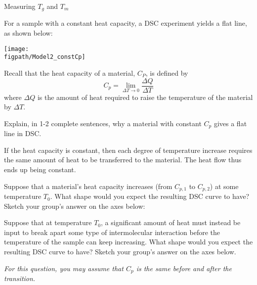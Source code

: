 \begin{activity}{Measuring $T_g$ and $T_m$}
\begin{model}
	For a sample with a constant heat capacity, a DSC experiment yields a flat line, as shown below:
	
		\centerline{\texttt{[image: \\figpath/Model2\_constCp]}}
	
\end{model}

\begin{ctqs}

	\question Recall that the heat capacity of a material, $C_P$, is defined by
		\begin{equation*}
			C_p = \lim_{\Delta T\to 0} \frac{\Delta Q}{\Delta T}
		\end{equation*}
		where $\Delta Q$ is the amount of heat required to raise the temperature of the material by $\Delta T$.
		
		Explain, in 1-2 complete sentences, why a material with constant $C_p$ gives a flat line in DSC.
		
			\begin{solution}[1in]
				If the heat capacity is constant, then each degree of temperature increase requires the same amount of heat to be transferred to the material.  The heat flow thus ends up being constant.
			\end{solution}
		
	\question Suppose that a material's heat capacity increases (from $C_{p,1}$ to $C_{p,2}$) at some temperature $T_0$.  What shape would you expect the resulting DSC curve to have?  Sketch your group's answer on the axes below: \label{\labelbase:ctq:CPincrease}
	
		\vspace{6pt}
		\begin{solution}[1.9in]\end{solution}
		
	\question Suppose that at temperature $T_0$, a significant amount of heat must instead be input to break apart some type of intermolecular interaction before the temperature of the sample can keep increasing.  What shape would you expect the resulting DSC curve to have?  Sketch your group's answer on the axes below.\label{\labelbase:ctq:delHtrans}
	
		\emph{For this question, you may assume that $C_p$ is the same before and after the transition.}
	

\end{ctqs}
\end{activity}
